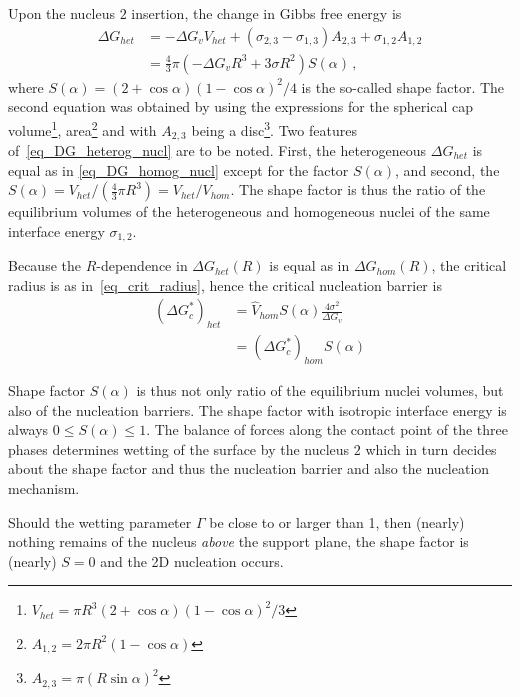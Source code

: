         Upon the nucleus $\mathit{2}$ insertion, the change in Gibbs free energy is
        \begin{align}
            \Delta G_{het} &= -\Delta G_v V_{het} + (\sigma_{2,3}-\sigma_{1,3})A_{2,3} + \sigma_{1,2}A_{1,2} \\
                &= \frac{4}{3}\pi(-\Delta G_v R^3 + 3\sigma R^2) S(\alpha) \,, \label{eq_DG_heterog_nucl}
        \end{align}
        where $S(\alpha)=(2+\cos\alpha)(1-\cos\alpha)^2/4$ is the so-called shape factor. The second equation was obtained by using the expressions for the spherical cap volume\footnote{$V_{het}=\pi R^3(2+\cos\alpha)(1-\cos\alpha)^2/3$}, area\footnote{$A_{1,2}=2\pi R^2(1-\cos\alpha)$} and with $A_{2,3}$ being a disc\footnote{$A_{2,3}=\pi(R\sin\alpha)^2$}. Two features of~\eqref{eq_DG_heterog_nucl} are to be noted. First, the heterogeneous $\Delta G_{het}$ is equal as in \eqref{eq_DG_homog_nucl} except for the factor $S(\alpha)$, and second, the $S(\alpha)=V_{het}/(\frac{4}{3}\pi R^3)=V_{het}/V_{hom}$. The shape factor is thus the ratio of the equilibrium volumes of the heterogeneous and homogeneous nuclei of the same interface energy $\sigma_{1,2}$.
        
        Because the $R$-dependence in $\Delta G_{het}(R)$ is equal as in $\Delta G_{hom}(R)$, the critical radius is as in~\eqref{eq_crit_radius}, hence the critical nucleation barrier is 
        \begin{align}
            (\Delta G^*_c)_{het} &= \hat{V}_{hom}S(\alpha)\frac{4\sigma^2}{\Delta G_v} \\
                &= (\Delta G^*_c)_{hom}S(\alpha)
        \end{align}
        
        Shape factor $S(\alpha)$ is thus not only ratio of the equilibrium nuclei volumes, but also of the nucleation barriers. The shape factor with isotropic interface energy is always $0\leq S(\alpha)\leq1$. The balance of forces along the contact point of the three phases determines wetting of the surface by the nucleus $\mathit{2}$ which in turn decides about the shape factor and thus the nucleation barrier and also the nucleation mechanism. 
        
        Should the wetting parameter $\Gamma$ be close to or larger than 1, then (nearly) nothing remains of the nucleus \textit{above} the support plane, the shape factor is (nearly) $S=0$ and the 2D nucleation occurs. 
    
